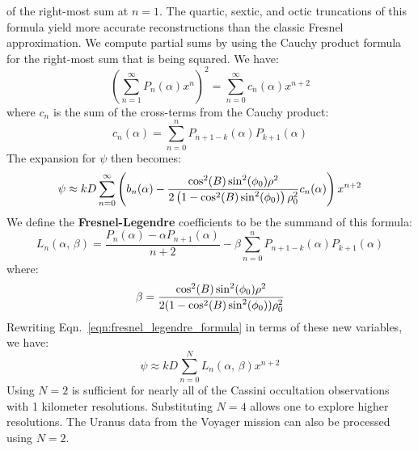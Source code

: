 \documentclass{article}
\theoremstyle{plain}
\begin{document}
        of the right-most sum at $n=1$. The quartic, sextic, and octic
        truncations of this formula yield more
        accurate reconstructions than the classic Fresnel approximation. We
        compute partial sums by using the Cauchy product formula for the
        right-most sum that is being squared. We have:
        \begin{equation}
            \left(\sum_{n=1}^{\infty}P_{n}(\alpha)x^{n}\right)^{2}
            =\sum_{n=0}^{\infty}c_{n}(\alpha)x^{n+2}
        \end{equation}
        where $c_{n}$ is the sum of the cross-terms from the Cauchy product:
        \begin{equation}
            c_{n}(\alpha)=\sum_{n=0}^{n}P_{n+1-k}(\alpha)P_{k+1}(\alpha)
        \end{equation}
        The expansion for $\psi$ then becomes:
        \begin{equation}
            \label{eqn:fresnel_legendre_formula}
            \psi\approx
            kD\sum_{n=0}^{\infty}\left(
                b_{n}(\alpha)-
                \frac{%
                    \cos^{2}(B)\sin^{2}(\phi_{0})\rho^{2}
                }{%
                    2\left(1-\cos^{2}(B)\sin^{2}(\phi_{0})\right)
                    \rho_{0}^{2}
                }
                c_{n}(\alpha)
            \right)x^{n+2}
        \end{equation}
        We define the \textbf{Fresnel-Legendre} coefficients to be the
        summand of this formula:
        \begin{equation}
            \label{eqn:fresnel_legendre_coeffs}
            L_{n}(\alpha,\,\beta)
            =\frac{P_{n}(\alpha)-\alpha{P}_{n+1}(\alpha)}{n+2}
                -\beta\sum_{n=0}^{n}P_{n+1-k}(\alpha)P_{k+1}(\alpha)
        \end{equation}
        where:
        \begin{equation}
            \beta=
            \frac{%
                \cos^{2}(B)\sin^{2}(\phi_{0})\rho^{2}
            }{%
                2(1-\cos^{2}(B)\sin^{2}(\phi_{0}))\rho_{0}^{2}
            }
        \end{equation}
        Rewriting Eqn.~\ref{eqn:fresnel_legendre_formula} in terms of
        these new variables, we have:
        \begin{equation}
            \psi\approx{k}D\sum_{n=0}^{N}L_{n}(\alpha,\,\beta)x^{n+2}
        \end{equation}
        Using $N=2$ is sufficient for nearly all of the Cassini occultation
        observations with 1 kilometer resolutions. Substituting $N=4$
        allows one to explore higher resolutions. The Uranus data from the
        Voyager mission can also be processed using $N=2$.
\end{document}
